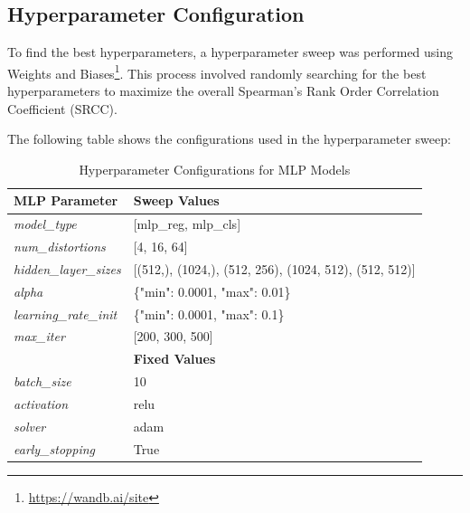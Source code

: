 \subsection{Hyperparameter Configuration}
\label{sub:HyperparamConfig}
To find the best hyperparameters, a hyperparameter sweep was performed using Weights and Biases\footnote{\url{https://wandb.ai/site}}. This process involved randomly searching for the best hyperparameters to maximize the overall Spearman’s Rank Order Correlation Coefficient (SRCC). \par
\vspace{\baselineskip}
\noindent
The following table shows the configurations used in the hyperparameter sweep: \par
 \begin{table}[ht]
    \centering
    \begin{tabular}{|l|l|}
        \hline
        \textbf{MLP Parameter} & \textbf{Sweep Values} \\
        \hline
        \textit{model\_type} & [mlp\_reg, mlp\_cls] \\
        \textit{num\_distortions} & [4, 16, 64] \\
        \textit{hidden\_layer\_sizes} & [(512,), (1024,), (512, 256), (1024, 512), (512, 512)] \\
        \textit{alpha} & \{"min": 0.0001, "max": 0.01\} \\
        \textit{learning\_rate\_init} & \{"min": 0.0001, "max": 0.1\} \\
        \textit{max\_iter} & [200, 300, 500] \\
        \hline
        \textbf{} & \textbf{Fixed Values} \\
        \hline
        \textit{batch\_size} & 10 \\
        \textit{activation} & relu \\
        \textit{solver} & adam \\
        \textit{early\_stopping} & True \\
        \hline
    \end{tabular}
    \caption{Hyperparameter Configurations for MLP Models}
    \label{table:mlp_hyperparams}
\end{table}
\vspace{\baselineskip}
